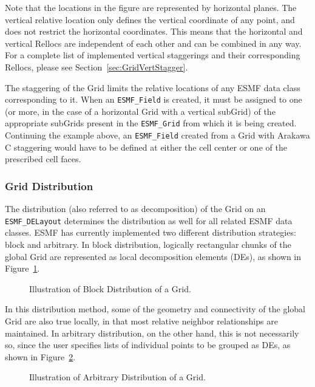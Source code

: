 Note that the locations in the figure are represented by horizontal planes.  The
vertical relative location only defines the vertical coordinate of any point, and
does not restrict the horizontal coordinates.  This means that the horizontal and
vertical Rellocs are independent of each other and can be combined in any way.
For a complete list of implemented vertical staggerings and their corresponding
Rellocs, please see Section~\ref{sec:GridVertStagger}.

The staggering of the Grid limits the relative locations of any ESMF data 
class corresponding to it.  When an {\tt ESMF\_Field} is created, it must be
assigned to one (or more, in the case of a horizontal Grid with a vertical
subGrid) of the appropriate subGrids present in the {\tt ESMF\_Grid} from
which it is being created.  Continuing the example above, an {\tt ESMF\_Field}
created from a Grid with Arakawa C staggering would have to be defined at either
the cell center or one of the prescribed cell faces. 


\subsubsection{Grid Distribution}

The distribution (also referred to as decomposition) of the Grid on an
{\tt ESMF\_DELayout} determines the distribution as well for all related
ESMF data classes.  ESMF has currently implemented two different distribution
strategies: block and arbitrary.  In block distribution, logically rectangular
chunks of the global Grid are represented as local decomposition elements
(DEs), as shown in Figure~\ref{fig:GridBlockDistribute}.

\begin{center}
\begin{figure}[h!tb]
\caption{Illustration of Block Distribution of a Grid. }
\label{fig:GridBlockDistribute}
\end{figure}
\end{center}

In this distribution method, some of the geometry and connectivity of the global
Grid are also true locally, in that most relative neighbor relationships are
maintained.  In arbitrary distribution, on the other hand, this is not
necessarily so, since the user specifies lists of individual points to
be grouped as DEs, as shown in Figure~\ref{fig:GridArbitraryDistribute}.

\begin{center}
\begin{figure}[h!tb]
\caption{Illustration of Arbitrary Distribution of a Grid. }
\label{fig:GridArbitraryDistribute}
\end{figure}
\end{center}


